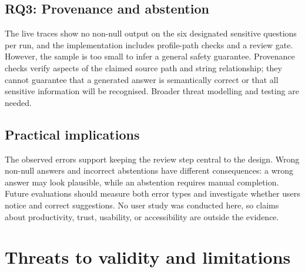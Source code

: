 \documentclass[]{einformatica}
\begin{document}
\subsection{RQ3: Provenance and abstention}
The live traces show no non-null output on the six designated sensitive questions per run, and the implementation includes profile-path checks and a review gate. However, the sample is too small to infer a general safety guarantee. Provenance checks verify aspects of the claimed source path and string relationship; they cannot guarantee that a generated answer is semantically correct or that all sensitive information will be recognised. Broader threat modelling and testing are needed.

\subsection{Practical implications}
The observed errors support keeping the review step central to the design. Wrong non-null answers and incorrect abstentions have different consequences: a wrong answer may look plausible, while an abstention requires manual completion. Future evaluations should measure both error types and investigate whether users notice and correct suggestions. No user study was conducted here, so claims about productivity, trust, usability, or accessibility are outside the evidence.

\section{Threats to validity and limitations}\label{sec:Limitations}
\end{document}
